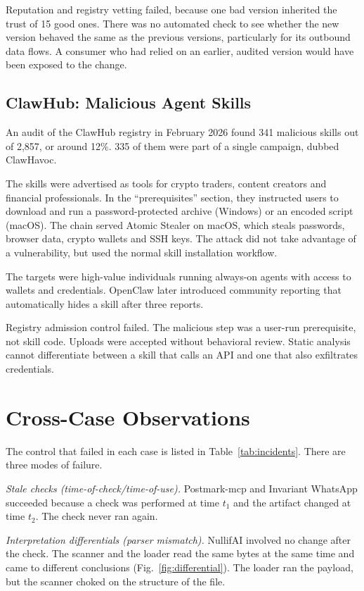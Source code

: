 \documentclass[conference]{IEEEtran}
\begin{document}
Reputation and registry vetting failed, because one bad version inherited the trust of 15 good ones. There was no automated check to see whether the new version behaved the same as the previous versions, particularly for its outbound data flows. A consumer who had relied on an earlier, audited version would have been exposed to the change.

\subsection{ClawHub: Malicious Agent Skills}
\label{sec:case-clawhub}

An audit of the ClawHub registry in February 2026 found 341 malicious skills out of 2,857, or around 12\%. 335 of them were part of a single campaign, dubbed ClawHavoc.

The skills were advertised as tools for crypto traders, content creators and financial professionals. In the ``prerequisites'' section, they instructed users to download and run a password-protected archive (Windows) or an encoded script (macOS). The chain served Atomic Stealer on macOS, which steals passwords, browser data, crypto wallets and SSH keys. The attack did not take advantage of a vulnerability, but used the normal skill installation workflow.

The targets were high-value individuals running always-on agents with access to wallets and credentials. OpenClaw later introduced community reporting that automatically hides a skill after three reports.

Registry admission control failed. The malicious step was a user-run prerequisite, not skill code. Uploads were accepted without behavioral review. Static analysis cannot differentiate between a skill that calls an API and one that also exfiltrates credentials.

\section{Cross-Case Observations}
\label{sec:case-observations}

The control that failed in each case is listed in Table~\ref{tab:incidents}. There are three modes of failure.

\emph{Stale checks (time-of-check/time-of-use).} Postmark-mcp and Invariant WhatsApp succeeded because a check was performed at time $t_1$ and the artifact changed at time $t_2$. The check never ran again.

\emph{Interpretation differentials (parser mismatch).} NullifAI involved no change after the check. The scanner and the loader read the same bytes at the same time and came to different conclusions (Fig.~\ref{fig:differential}). The loader ran the payload, but the scanner choked on the structure of the file.
\end{document}
